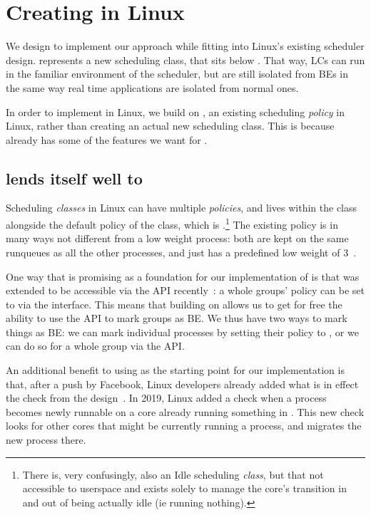\section{Creating \beclass{} in Linux}\label{s:design}

We design \beclass{} to implement our approach while fitting into Linux's
existing scheduler design. \beclass{} represents a new scheduling class, that
sits below \schednormal{}. That way, LCs can run in the familiar environment of
the \normalclass{} scheduler, but are still isolated from BEs in the same way
real time applications are isolated from normal ones.

In order to implement \beclass{} in Linux, we build on \schedidle{}, an existing
scheduling \textit{policy} in Linux, rather than creating an actual new
scheduling class. This is because \schedidle{} already has some of the features
we want for \beclass{}.

\subsection{\schedidle{} lends itself well to \beclass{}}

Scheduling \textit{classes} in Linux can have multiple \textit{policies}, and
\schedidle{} lives within the \normalclass{} class alongside the default policy
of the \normalclass{} class, which is \schednormal{}.\footnote{There is, very
confusingly, also an Idle scheduling \textit{class}, but that not accessible to
userspace and exists solely to manage the core's transition in and out of being
actually idle (ie running nothing).} The existing \schedidle{} policy is in many
ways not different from a low weight \schednormal{} process: both are kept on
the same runqueues as all the other \schednormal{} processes, and \schedidle{}
just has a predefined low weight of 3~\cite{weight-idleprio}.

One way that \schedidle{} is promising as a foundation for our implementation of
\beclass{} is that \schedidle{} was extended to be accessible via the \cgroups{}
API recently~\cite{lkml-idle-cgroup}: a whole groups' policy can be set to
\schedidle{} via the \cgroups{} interface. This means that building on
\schedidle{} allows us to get for free the ability to use the \cgroups{} API to
mark groups as BE. We thus have two ways to mark things as BE: we can mark
individual processes by setting their policy to \schedidle{}, or we can do so
for a whole group via the \cgroups{} API.

An additional benefit to using \schedidle{} as the starting point for our
implementation is that, after a push by Facebook, Linux developers already added
what is in effect the \entry{} check from the \beclass{}
design~\cite{fixing-idle-article}. In 2019, Linux added a check when a
\schednormal{} process becomes newly runnable on a core already running something
in \schednormal{}. This new check looks for other cores that might be currently
running a \schedidle{} process, and migrates the new process there.

